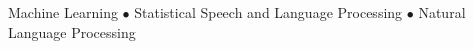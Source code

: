 Machine Learning $\bullet$ Statistical Speech and Language Processing $\bullet$ Natural Language Processing

